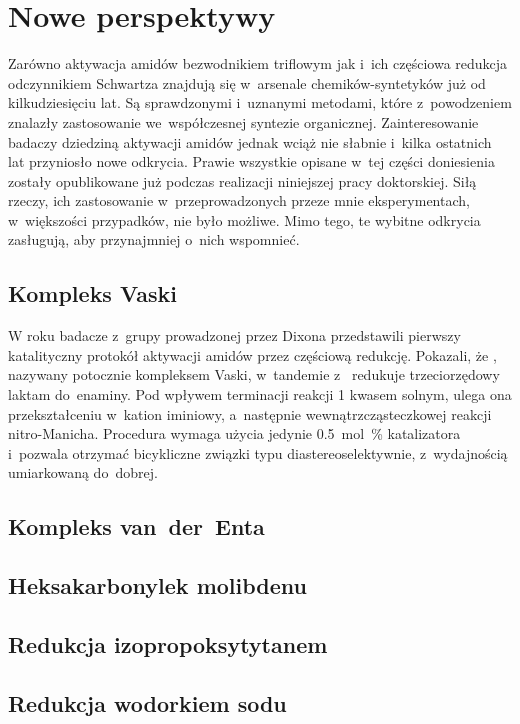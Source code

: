 \section{Nowe perspektywy}\label{literature:new}
Zarówno aktywacja amidów bezwodnikiem triflowym jak i~ich częściowa redukcja odczynnikiem
  Schwartza znajdują się w~arsenale chemików-syntetyków już od kilkudziesięciu lat.
Są sprawdzonymi i~uznanymi metodami, które z~powodzeniem znalazły zastosowanie
  we~współczesnej syntezie organicznej.
Zainteresowanie badaczy dziedziną aktywacji amidów jednak wciąż nie słabnie i~kilka
  ostatnich lat przyniosło nowe odkrycia.
Prawie wszystkie opisane w~tej części doniesienia zostały opublikowane już podczas
  realizacji niniejszej pracy doktorskiej.
Siłą rzeczy, ich zastosowanie w~przeprowadzonych przeze mnie eksperymentach, w~większości
  przypadków, nie było możliwe.
Mimo tego, te wybitne odkrycia zasługują, aby przynajmniej o~nich wspomnieć.

\subsection{Kompleks Vaski}\label{literature:new:vasca}
W roku \citeyear{gregory15} badacze z~grupy prowadzonej przez Dixona przedstawili pierwszy
  katalityczny protokół aktywacji amidów przez częściową redukcję.
Pokazali, że \vaska{}, nazywany potocznie kompleksem Vaski, w~tandemie z~
  redukuje trzeciorzędowy laktam  do~enaminy.
Pod wpływem terminacji reakcji \SI{1}{\Molar} kwasem solnym, ulega ona przekształceniu
  w~kation iminiowy, a~następnie wewnątrzcząsteczkowej reakcji nitro-Manicha.
Procedura wymaga użycia jedynie \SI{0.5}{\mole\percent} katalizatora i~pozwala otrzymać
  bicykliczne związki typu  diastereoselektywnie, z~wydajnością
  umiarkowaną do~dobrej.

\subsection{Kompleks van~der~Enta}\label{literature:new:van-der-ent}
\subsection{Heksakarbonylek molibdenu}\label{literature:new:molydenium}
\subsection{Redukcja izopropoksytytanem}\label{literature:new:titanium}
\subsection{Redukcja wodorkiem sodu}\label{literature:new:sodium-hydride}

